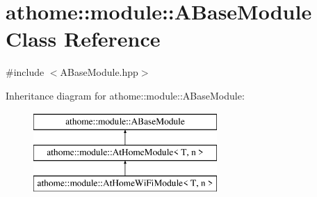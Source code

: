 \hypertarget{classathome_1_1module_1_1_a_base_module}{}\section{athome\+:\+:module\+:\+:A\+Base\+Module Class Reference}
\label{classathome_1_1module_1_1_a_base_module}


{\ttfamily \#include $<$A\+Base\+Module.\+hpp$>$}

Inheritance diagram for athome\+:\+:module\+:\+:A\+Base\+Module\+:\begin{figure}[H]
\begin{center}
\leavevmode
\includegraphics[height=3.000000cm]{classathome_1_1module_1_1_a_base_module}
\end{center}
\end{figure}
